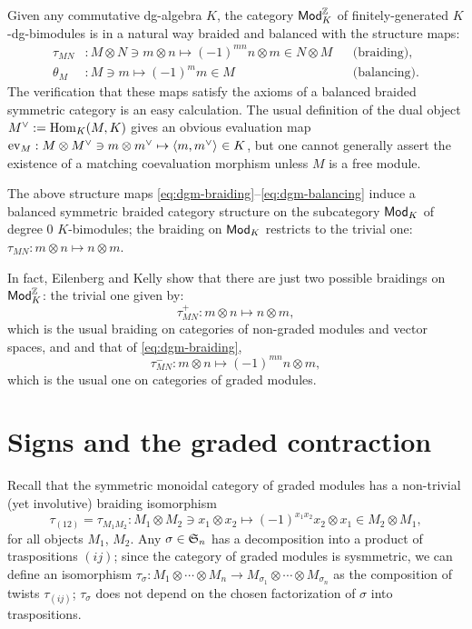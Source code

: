 Given any commutative dg-algebra $K$, the category $\mathsf{Mod}_K^{\mathbb{Z}}$ of
finitely-generated $K$-dg-bimodules is in a natural way braided and
balanced with the structure maps:
\begin{align}
  \label{eq:dgm-braiding}
  \tau_{MN} &: M \otimes N \ni m\otimes n \mapsto (-1)^{mn}n\otimes m \in N \otimes M
  &&
  \text{(braiding),}
  \\
  \label{eq:dgm-balancing}
  \theta_M &: M \ni m \mapsto (-1)^mm \in M
  &&
  \text{(balancing).}
\end{align}
The verification that these maps satisfy the axioms of a balanced
braided symmetric category is an easy calculation.  The usual
definition of the dual object $\rdl{M} := \Hom_K(M, K)$ gives an
obvious evaluation map $\ev_M : M \otimes \rdl{M} \ni m \otimes \rdl{m} \mapsto
\pairing{m}{\rdl{m}} \in K$, but one cannot generally assert the
existence of a matching coevaluation morphism unless $M$ is a free
module.

The above structure maps
\eqref{eq:dgm-braiding}--\eqref{eq:dgm-balancing} induce a balanced
symmetric braided category structure on the subcategory $\mathsf{Mod}_K$ of
degree $0$ $K$-bimodules; the braiding on $\mathsf{Mod}_K$ restricts to the
trivial one: $\tau_{MN}: m\otimes n \mapsto n\otimes m$.
\begin{remark}
  In fact, Eilenberg and Kelly \cite{eilenberg-kelly;closed-categories}
  show that there are just two possible braidings on $\mathsf{Mod}_K^{\mathbb{Z}}$:
  the trivial one given by:
  \begin{equation*}
    \tau_{MN}^+ : m\otimes n \mapsto n\otimes m,
  \end{equation*}
  which is the usual braiding on categories of non-graded modules and
  vector spaces, and and that of \eqref{eq:dgm-braiding},
  \begin{equation*}
    \tau_{MN}^- : m\otimes n \mapsto (-1)^{mn} n\otimes m,
  \end{equation*}
  which is the usual one on categories of graded modules.
\end{remark}


\section{Signs and the graded contraction}
\label{sec:signs}

Recall that the symmetric monoidal category of graded modules has a
non-trivial (yet involutive) braiding isomorphism
\begin{equation*}
\tau_{(12)} = \tau_{M_1M_2} : M_1
\otimes M_2 \ni x_1\otimes x_2 \mapsto (-1)^{x_1x_2} x_2\otimes x_1
\in M_2\otimes M_1,
\end{equation*}
for all objects $M_1$, $M_2$.  Any $\sigma\in\mathfrak{S}_{n}$ has a decomposition
into a product of traspositions $(ij)$; since the category of graded
modules is sysmmetric, we can define an isomorphism $\tau_\sigma: M_1 \otimes \cdots \otimes
M_n \to M_{\sigma_1} \otimes \cdots \otimes M_{\sigma_n}$ as the composition of twists $\tau_{(ij)}$;
$\tau_\sigma$ does not depend on the chosen factorization of $\sigma$ into
traspositions.

